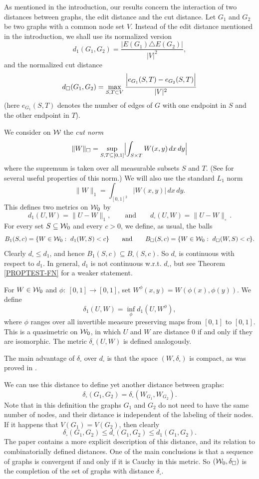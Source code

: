 \documentclass{article}
\begin{document}
As mentioned in the introduction, our results concern the interaction
of two distances between graphs, the edit distance and the cut
distance. Let $G_1$ and $G_2$ be two graphs with a common node set
$V$. Instead of the edit distance mentioned in the introduction, we
shall use its normalized version
\[
d_1(G_1,G_2)=\frac{|E(G_1)\triangle E(G_2)|}{|V|^2},
\]
and the normalized cut distance
\[
d_\square(G_1,G_2)=\max_{S,T\subset V}
\frac{\Bigl|e_{G_1}(S,T)-e_{G_2}(S,T)\Bigr|}{|V|^2}
\]
(here $e_{G_1}(S,T)$ denotes the number of edges of $G$ with one
endpoint in $S$ and  the other endpoint in $T$).

We consider on $\mathcal{W}$ the {\it cut norm}
\[
\|W\|_\square = \sup_{S,T\subseteq[0,1]}\Bigl|\int_{S\times T}
W(x,y)\,dx\,dy\Bigr|
\]
where the supremum is taken over all measurable subsets $S$ and $T$.
(See \cite{BCLSV1} for several useful properties of this norm.) We
will also use the standard $L_1$ norm
\[
\|W\|_1=\int_{[0,1]^2} |W(x,y)|\,dx\,dy.
\]
This defines two metrics on $\mathcal{W}_0$ by
\[
d_1(U,W)=\|U-W\|_1,\qquad\text{and}\qquad
d_\square(U,W)=\|U-W\|_\square\,.
\]
For every set $S\subseteq\mathcal{W}_0$ and every $c>0$, we define, as usual,
the balls
\[
B_1(S,c)=\{W\in\mathcal{W}_0:~ d_1(W,S)<c\} \qquad\text{and}\qquad
B_\square(S,c)=\{W\in\mathcal{W}_0:~ d_\square(W,S)<c\}.
\]
Clearly $d_\square\le d_1$, and hence $B_1(S,c)\subseteq
B_\square(S,c)$. So $d_\square$ is continuous with respect to $d_1$.
In general, $d_1$ is not continuous w.r.t. $d_\square$, but see
Theorem \ref{PROPTEST-FN} for a weaker statement.

For $W\in\mathcal{W}_0$ and $\phi:~[0,1]\to[0,1]$, set
$W^\phi(x,y)=W(\phi(x),\phi(y))$. We define
\[
\delta_1(U,W)=\inf_\phi d_1(U,W^\phi),
\]
where $\phi$ ranges over all invertible measure preserving maps from
$[0,1]$ to $[0,1]$. This is a quasimetric on $\mathcal{W}_0$, in which $U$
and $W$ are distance $0$ if and only if they are isomorphic. The
metric $\delta_\square(U,W)$ is defined analogously.

The main advantage of $\delta_\square$ over $d_\square$ is that the
space $(W,\delta_\square)$ is compact, as was proved in \cite{LSz2}.

We can use this distance to define yet another distance between
graphs:
\[
\delta_\square(G_1,G_2)= \delta_\square(W_{G_1},W_{G_2}).
\]
Note that in this definition the graphs $G_1$ and $G_2$ do not need
to have the same number of nodes, and their distance is independent
of the labeling of their nodes. If it happens that $V(G_1)=V(G_2)$,
then clearly
\[
\delta_\square(G_1,G_2)\le d_\square(G_1,G_2)\le d_1(G_1,G_2).
\]
The paper \cite{BCLSV1} contains a more explicit description of this
distance, and its relation to combinatorially defined distances. One
of the main conclusions is that a sequence of graphs is convergent if
and only if it is Cauchy in this metric. So $(\mathcal{W}_0,\delta_\square)$
is the completion of the set of graphs with distance
$\delta_\square$.
\end{document}
